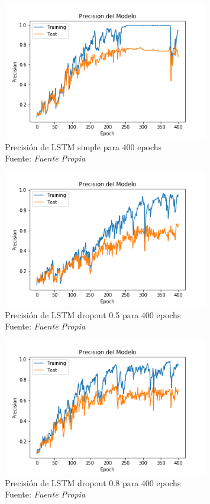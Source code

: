 \begin{figure}[H]
	\centering
	\includegraphics[width=0.8\textwidth]{Figures/lstm_400_prec_13mfcc}
	\caption{Precisión de LSTM simple para 400 epochs\\ Fuente: {\textit{Fuente Propia}}}
	\label{LSTMsimpel}
\end{figure} 

\begin{figure}[H]
	\centering
	\includegraphics[width=0.8\textwidth]{Figures/lstm_400drop05_prec_13mfcc}
	\caption{Precisión de LSTM dropout 0.5 para 400 epochs\\ Fuente: {\textit{Fuente Propia}}}
	\label{LSTMdropout5}
\end{figure} 



\begin{figure}[H]
	\centering
	\includegraphics[width=0.8\textwidth]{Figures/lstm_400drop08_prec_13mfcc}
	\caption{Precisión de LSTM dropout 0.8 para 400 epochs\\ Fuente: {\textit{Fuente Propia}}}
	\label{LSTMdropout8}
\end{figure} 


